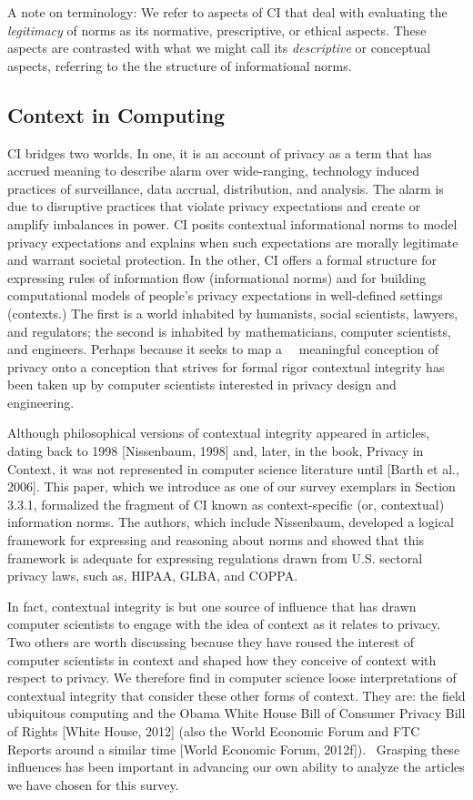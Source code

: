 \documentclass[../thesis.tex]{subfiles}
\begin{document}
\bigskip

A note on terminology: We refer to aspects of CI that deal with
evaluating the \textit{legitimacy} of norms as its normative,
prescriptive, or ethical aspects. These aspects are contrasted with
what we might call its \textit{descriptive} or conceptual aspects,
referring to the the structure of informational norms.


\subsection{Context in Computing}
\label{CI2.2}

CI bridges two worlds. In one, it is an account of
privacy as a term that has accrued meaning to describe alarm over
wide-ranging, technology induced practices of surveillance, data
accrual, distribution, and analysis. The alarm is due to disruptive
practices that violate privacy expectations and create or amplify
imbalances in power. CI posits contextual informational norms to model
privacy expectations and explains when such expectations are morally
legitimate and warrant societal protection. In the other, CI offers a
formal structure for expressing rules of information flow
(informational norms) and for building computational models of
people's privacy expectations in well-defined settings
(contexts.) The first is a world inhabited by humanists, social
scientists, lawyers, and regulators; the second is inhabited by
mathematicians, computer scientists, and engineers. Perhaps because it
seeks to map a \ \ meaningful conception of privacy onto a conception
that strives for formal rigor contextual integrity has been taken up by
computer scientists interested in privacy design and engineering. 

Although philosophical versions of contextual
integrity appeared in articles, dating back to 1998 [Nissenbaum, 1998]
and, later, in the book, Privacy in Context, it was not represented in
computer science literature until [Barth et al., 2006]. This paper,
which we introduce as one of our survey exemplars in Section 3.3.1,
formalized the fragment of CI known as context-specific (or,
contextual) information norms. The authors, which include Nissenbaum,
developed a logical framework for expressing and reasoning about norms
and showed that this framework is adequate for expressing regulations
drawn from U.S. sectoral privacy laws, such as, HIPAA, GLBA, and COPPA.

In fact, contextual integrity is but one source of influence that has
drawn computer scientists to engage with the idea of context as it
relates to privacy. Two others are worth discussing because they have
roused the interest of computer scientists in context and shaped how
they conceive of context with respect to privacy. We therefore find in
computer science loose interpretations of contextual integrity that
consider these other forms of context. They are: the field ubiquitous
computing and the Obama White House Bill of Consumer Privacy Bill of
Rights [White House, 2012] (also the World Economic Forum and FTC
Reports around a similar time [World Economic Forum, 2012f]).
\ Grasping these influences has been important in advancing our own
ability to analyze the articles we have chosen for this survey. \ 
\end{document}
